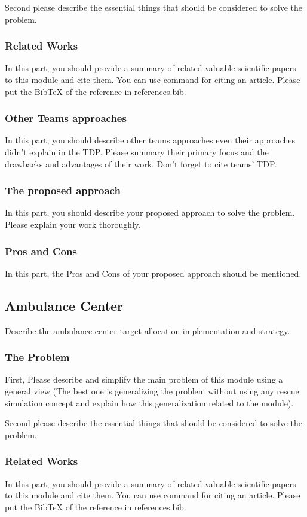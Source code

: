 \documentclass[runningheads,a4paper]{llncs}
\begin{document}
Second please describe the essential things that should be considered to solve the problem.
\subsubsection{Related Works}
In this part, you should provide a summary of related valuable scientific papers to this module and cite them. You can use command \cite{ref1} for citing an article. Please put the BibTeX of the reference in references.bib.
\subsubsection{Other Teams approaches}
In this part, you should describe other teams approaches even their approaches didn't explain in the TDP. Please summary their primary focus and the drawbacks and advantages of their work. Don't forget to cite teams' TDP.
\subsubsection{The proposed approach}
In this part, you should describe your proposed approach to solve the problem. Please explain your work thoroughly.
\subsubsection{Pros and Cons}
In this part, the Pros and Cons of your proposed approach should be mentioned.

\subsection{Ambulance Center}
Describe the ambulance center target allocation implementation and strategy.
\subsubsection{The Problem}
First, Please describe and simplify the main problem of this module using a general view (The best one is generalizing the problem without using any rescue simulation concept and explain how this generalization related to the module).

Second please describe the essential things that should be considered to solve the problem.
\subsubsection{Related Works}
In this part, you should provide a summary of related valuable scientific papers to this module and cite them. You can use command \cite{ref1} for citing an article. Please put the BibTeX of the reference in references.bib.
\end{document}
